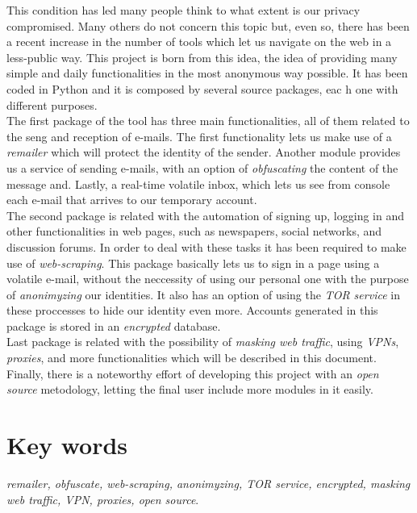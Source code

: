 This condition has led many people think to what extent is our privacy compromised. Many others do not concern this topic but, even so, there has been a recent increase in the number of tools which let us navigate on the web in a less-public way. This project is born from this idea, the idea of providing many simple and daily functionalities in the most anonymous way possible. It has been coded in Python and it is composed by several source packages, eac h one with different purposes.\\
The first package of the tool has three main functionalities, all of them related to the seng and reception of e-mails. The first functionality lets us make use of a \textit{remailer} which will protect the identity of the sender. Another module provides us a service of sending e-mails, with an option of \textit{obfuscating} the content of the message and. Lastly, a real-time volatile inbox, which lets us see from console each e-mail that arrives to our temporary account.\\
The second package is related with the automation of signing up, logging in and other functionalities in web pages, such as newspapers, social networks, and discussion forums. In order to deal with these tasks it has been required to make use of \textit{web-scraping}. This package basically lets us to sign in a page using a volatile e-mail, without the neccessity of using our personal one with the purpose of \textit{anonimyzing} our identities. It also has an option of using the \textit{TOR service} in these proccesses to hide our identity even more. Accounts generated in this package is stored in an \textit{encrypted} database. \\
Last package is related with the possibility of \textit{masking web traffic}, using \textit{VPNs}, \textit{proxies}, and more functionalities which will be described in this document.\\
Finally, there is a noteworthy effort of developing this project with an \textit{open source} metodology, letting the final user include more modules in it easily.\\

\section*{Key words}
\textit{remailer, obfuscate, web-scraping, anonimyzing, TOR service, encrypted, masking web traffic, VPN, proxies, open source}.
